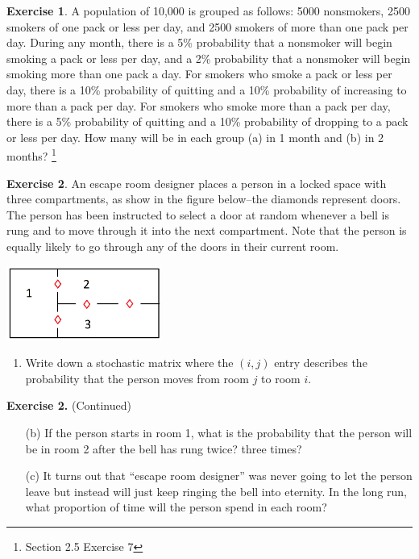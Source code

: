 \documentclass[handout]{beamer}
\newcommand{\fn}{\insertframenumber}
\theoremstyle{definition}
\newtheorem{exercise}{Exercise}
\begin{document}
\begin{frame}{\fn}
	\begin{exercise}
		A population of 10,000 is grouped as follows: 5000 nonsmokers, 2500 smokers of one pack or less per day, and 2500 smokers of more than one pack per day.  During any month, there is a 5\% probability that a nonsmoker will begin smoking a pack or less per day, and a 2\% probability that a nonsmoker will begin smoking more than one pack a day.  For smokers who smoke a pack or less per day, there is a 10\% probability of quitting and a 10\% probability of increasing to more than a pack per day.  For smokers who smoke more than a pack per day, there is a 5\% probability of quitting and a 10\% probability of dropping to a pack or less per day.  How many will be in each group (a) in 1 month and (b) in 2 months?
		\footnote{Section 2.5 Exercise 7}
	\end{exercise}
\end{frame}
\begin{frame}{\fn}
\begin{exercise}
	An escape room designer places a person in a locked space with three compartments, as show in the figure below--the diamonds represent doors.  The person has been instructed to select a door at random whenever a bell is rung and to move through it into the next compartment. Note that the person is equally likely to go through any of the doors in their current room.
	\begin{center}
	\includegraphics[width=2in]{../images/markov1}
	\end{center}
	\begin{enumerate}[label=(\alph*)]
		\item Write down a stochastic matrix where the $(i,j)$ entry describes the probability that the person moves from room $j$ to room $i$.
	\end{enumerate}
\end{exercise}
\end{frame}
\begin{frame}{\fn}
\begin{block}{\textbf{Exercise 2.} (Continued)}
	\begin{enumerate}[label=(\alph*)]
		\item[(b)] If the person starts in room 1, what is the probability that the person will be in room 2 after the bell has rung twice? three times?\pause
		\item[(c)] It turns out that ``escape room designer'' was never going to let the person leave but instead will just keep ringing the bell into eternity.  In the long run, what proportion of time will the person spend in each room?
	\end{enumerate}
\end{block}
\end{frame}
\end{document}
